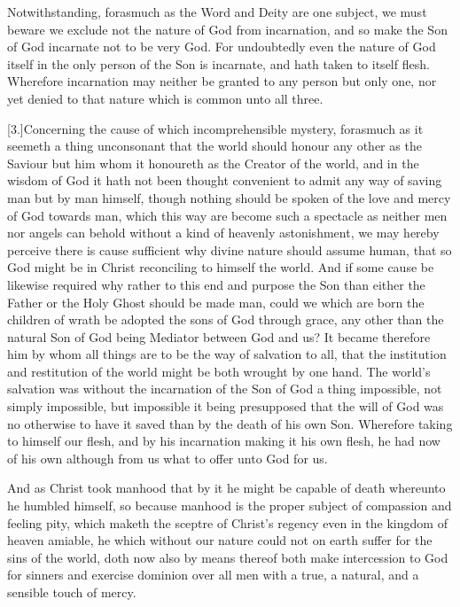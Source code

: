 Notwithstanding, forasmuch as the Word and Deity are one subject, we must beware we exclude not the nature of God from incarnation, and so make the Son of God incarnate not to be very God. For undoubtedly even the nature of God itself in the only person of the Son is incarnate, and hath taken to itself flesh. Wherefore incarnation may neither be granted to any person but only one, nor yet denied to that nature which is common unto all three.

[3.]Concerning the cause of which incomprehensible mystery, forasmuch as it seemeth a thing unconsonant that the world should honour any other as the Saviour but him whom it honoureth as the Creator of the world, and in the wisdom of God it hath not been thought convenient to admit any way of  saving man but by man himself,
 though nothing should be spoken of the love and mercy of God towards man, which this way are become such a spectacle as neither men nor angels can behold without a kind of heavenly astonishment, we may hereby perceive there is cause sufficient why divine nature should assume human, that so God might be in Christ reconciling to himself the world. And if some cause be likewise required why rather to this end and purpose the Son than either the Father or the Holy Ghost should be made man, could we which are born the children of wrath be adopted the sons of God through grace, any other than the natural Son of God being Mediator between God and us? It became therefore him by whom all things are to be the way of salvation to all, that the institution and restitution of the world might be both wrought by one hand. The world’s salvation was without the incarnation of the Son of God a thing impossible, not simply impossible, but impossible it being presupposed that the will of God was no otherwise to have it saved than by the death of his own Son. Wherefore taking to himself our flesh, and by his incarnation making it his own flesh, he had now of his own although from us what to offer unto God for us.

And as Christ took manhood that by it he might be capable of death whereunto he humbled himself, so because manhood is the proper subject of compassion and feeling pity, which maketh the sceptre of Christ’s regency even in the kingdom of heaven amiable, he which without our nature could not on earth suffer for the sins of the world, doth now also by means thereof both make intercession to God for sinners and exercise dominion over all men with a true, a natural, and a sensible touch of mercy.


